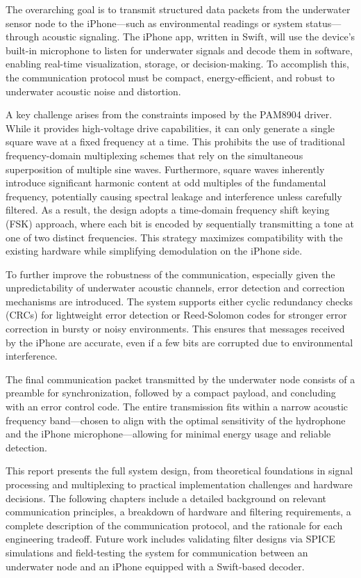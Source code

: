 The overarching goal is to transmit structured data packets from the underwater sensor node to the iPhone—such as environmental readings or system status—through acoustic signaling. The iPhone app, written in Swift, will use the device’s built-in microphone to listen for underwater signals and decode them in software, enabling real-time visualization, storage, or decision-making. To accomplish this, the communication protocol must be compact, energy-efficient, and robust to underwater acoustic noise and distortion.

A key challenge arises from the constraints imposed by the PAM8904 driver. While it provides high-voltage drive capabilities, it can only generate a single square wave at a fixed frequency at a time. This prohibits the use of traditional frequency-domain multiplexing schemes that rely on the simultaneous superposition of multiple sine waves. Furthermore, square waves inherently introduce significant harmonic content at odd multiples of the fundamental frequency, potentially causing spectral leakage and interference unless carefully filtered. As a result, the design adopts a time-domain frequency shift keying (FSK) approach, where each bit is encoded by sequentially transmitting a tone at one of two distinct frequencies. This strategy maximizes compatibility with the existing hardware while simplifying demodulation on the iPhone side.

To further improve the robustness of the communication, especially given the unpredictability of underwater acoustic channels, error detection and correction mechanisms are introduced. The system supports either cyclic redundancy checks (CRCs) for lightweight error detection or Reed-Solomon codes for stronger error correction in bursty or noisy environments. This ensures that messages received by the iPhone are accurate, even if a few bits are corrupted due to environmental interference.

The final communication packet transmitted by the underwater node consists of a preamble for synchronization, followed by a compact payload, and concluding with an error control code. The entire transmission fits within a narrow acoustic frequency band—chosen to align with the optimal sensitivity of the hydrophone and the iPhone microphone—allowing for minimal energy usage and reliable detection.

This report presents the full system design, from theoretical foundations in signal processing and multiplexing to practical implementation challenges and hardware decisions. The following chapters include a detailed background on relevant communication principles, a breakdown of hardware and filtering requirements, a complete description of the communication protocol, and the rationale for each engineering tradeoff. Future work includes validating filter designs via SPICE simulations and field-testing the system for communication between an underwater node and an iPhone equipped with a Swift-based decoder.


